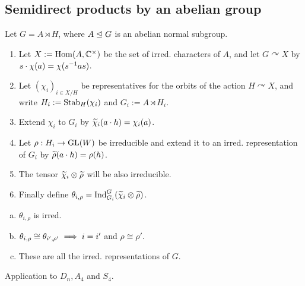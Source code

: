 \documentclass{article}
\begin{document}
\begin{multicols*}{2}
\section{Semidirect products by an abelian group}
\begin{const}
    Let $G = A \rtimes H$, where $A \trianglelefteq G$ is an abelian normal subgroup.
  \begin{enumerate}[(1)]
    \item Let $X:= \operatorname{Hom}(A,\mathbb C^\times)$ be the set of irred. characters of $A$, and let $G \curvearrowright X$ by $s\cdot \chi(a) = \chi(s^{-1}as)$.
    \item Let $(\chi_{i})_{i \in X/H}$ be representatives for the orbits of the action $H \curvearrowright X$, and write $H_{i} := \operatorname{Stab}_{H}(\chi_{i})$ and $G_{i} := A \rtimes H_{i}$.
    \item Extend $\chi_{i}$ to $G_{i}$ by $\widetilde \chi_{i}(a\cdot h) = \chi_{i}(a)$.
    \item Let $\rho: H_{i} \to \operatorname{GL}(W)$ be irreducible and extend it to an irred. representation of $G_{i}$ by $\widetilde \rho(a \cdot h) = \rho(h)$.
    \item The tensor $\widetilde \chi_{i} \otimes \widetilde \rho$ will be also irreducible.
    \item Finally define $\theta_{i, \rho} = \operatorname{Ind}_{G_{i}}^{G}(\widetilde \chi_{i} \otimes \widetilde \rho)$.
  \end{enumerate}
\end{const}
\begin{prop}
\begin{enumerate}[(a)]
  \item $\theta_{i, \rho}$ is irred.
  \item $\theta_{i,\rho} \cong \theta_{i',\rho'} \implies i = i'$ and $\rho \cong \rho'$.
  \item These are all the irred. representations of $G$.
\end{enumerate}
\end{prop}
\begin{exmp}
Application to $D_{n}, A_{4}$ and $S_{4}$.
\end{exmp}


\end{multicols*}
\end{document}
